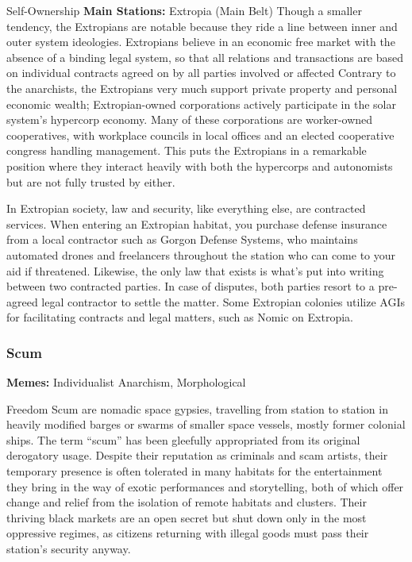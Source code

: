 Self-Ownership
\textbf{Main Stations:} Extropia (Main Belt)
Though a smaller tendency, the Extropians are notable
because they ride a line between inner and outer
system ideologies. Extropians believe in an economic 
free market with the absence of a binding legal system, 
so that all relations and transactions are based on individual
contracts agreed on by all parties involved or affected
Contrary to the anarchists, the Extropians very
much support private property and personal economic 
wealth; Extropian-owned corporations actively participate
in the solar system's hypercorp economy. Many
of these corporations are worker-owned cooperatives, 
with workplace councils in local offices and an elected 
cooperative congress handling management. This puts 
the Extropians in a remarkable position where they 
interact heavily with both the hypercorps and autonomists
but are not fully trusted by either.

In Extropian society, law and security, like everything
else, are contracted services. When entering an
Extropian habitat, you purchase defense insurance 
from a local contractor such as Gorgon Defense 
Systems, who maintains automated drones and 
freelancers throughout the station who can come 
to your aid if threatened. Likewise, the only law 
that exists is what's put into writing between two 
contracted parties. In case of disputes, both parties 
resort to a pre-agreed legal contractor to settle the 
matter. Some Extropian colonies utilize AGIs for facilitating
contracts and legal matters, such as Nomic
on Extropia.

\subsubsection{Scum}

\textbf{Memes:} Individualist Anarchism, Morphological 

Freedom
Scum are nomadic space gypsies, travelling from station
to station in heavily modified barges or swarms
of smaller space vessels, mostly former colonial ships. 
The term ``scum'' has been gleefully appropriated from 
its original derogatory usage. Despite their reputation 
as criminals and scam artists, their temporary presence 
is often tolerated in many habitats for the entertainment
they bring in the way of exotic performances
and storytelling, both of which offer change and relief 
from the isolation of remote habitats and clusters. 
Their thriving black markets are an open secret but 
shut down only in the most oppressive regimes, as 
citizens returning with illegal goods must pass their 
station's security anyway.

